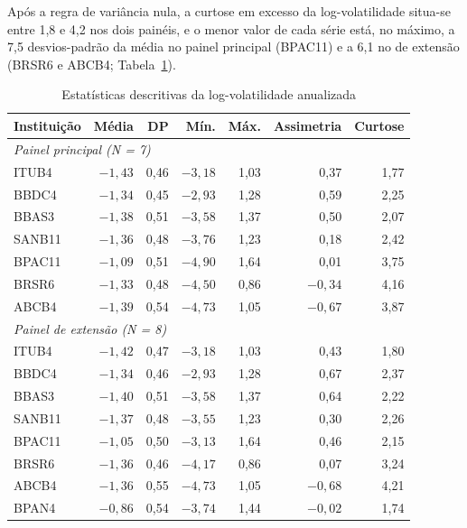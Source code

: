 Após a regra de variância nula, a curtose em excesso da log-volatilidade
situa-se entre 1,8 e 4,2 nos dois painéis, e o menor valor de cada série está,
no máximo, a 7,5 desvios-padrão da média no painel principal (BPAC11) e a 6,1
no de extensão (BRSR6 e ABCB4; Tabela~\ref{tab:descritivas}).


\begin{table}[!htbp]
\centering
\caption{Estatísticas descritivas da log-volatilidade anualizada}
\label{tab:descritivas}
\footnotesize
\renewcommand{\arraystretch}{0.9}
\begin{tabular}{lrrrrrr}
\toprule
Instituição & Média & DP & Mín. & Máx. & Assimetria & Curtose \\
\midrule
\multicolumn{7}{l}{\textit{Painel principal (N = 7)}} \\
ITUB4  & $-1{,}43$ & 0,46 & $-3{,}18$ & 1,03 &  0,37 & 1,77 \\
BBDC4  & $-1{,}34$ & 0,45 & $-2{,}93$ & 1,28 &  0,59 & 2,25 \\
BBAS3  & $-1{,}38$ & 0,51 & $-3{,}58$ & 1,37 &  0,50 & 2,07 \\
SANB11 & $-1{,}36$ & 0,48 & $-3{,}76$ & 1,23 &  0,18 & 2,42 \\
BPAC11 & $-1{,}09$ & 0,51 & $-4{,}90$ & 1,64 &  0,01 & 3,75 \\
BRSR6  & $-1{,}33$ & 0,48 & $-4{,}50$ & 0,86 & $-0{,}34$ & 4,16 \\
ABCB4  & $-1{,}39$ & 0,54 & $-4{,}73$ & 1,05 & $-0{,}67$ & 3,87 \\
\midrule
\multicolumn{7}{l}{\textit{Painel de extensão (N = 8)}} \\
ITUB4  & $-1{,}42$ & 0,47 & $-3{,}18$ & 1,03 &  0,43 & 1,80 \\
BBDC4  & $-1{,}34$ & 0,46 & $-2{,}93$ & 1,28 &  0,67 & 2,37 \\
BBAS3  & $-1{,}40$ & 0,51 & $-3{,}58$ & 1,37 &  0,64 & 2,22 \\
SANB11 & $-1{,}37$ & 0,48 & $-3{,}55$ & 1,23 &  0,30 & 2,26 \\
BPAC11 & $-1{,}05$ & 0,50 & $-3{,}13$ & 1,64 &  0,46 & 2,15 \\
BRSR6  & $-1{,}36$ & 0,46 & $-4{,}17$ & 0,86 &  0,07 & 3,24 \\
ABCB4  & $-1{,}36$ & 0,55 & $-4{,}73$ & 1,05 & $-0{,}68$ & 4,21 \\
BPAN4  & $-0{,}86$ & 0,54 & $-3{,}74$ & 1,44 & $-0{,}02$ & 1,74 \\
\bottomrule
\end{tabular}
\end{table}

